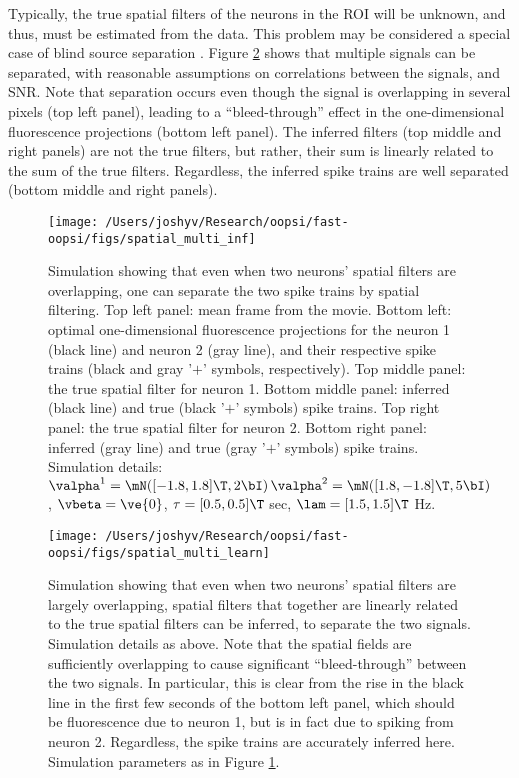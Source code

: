 Typically, the true spatial filters of the neurons in the ROI will be unknown, and thus, must be estimated from the data.  This problem may be considered a special case of blind source separation \cite{BellSejnowski95, MukamelSchnitzer09}. Figure \ref{fig:spatial_multi_learn} shows that multiple signals can be separated, with reasonable assumptions on correlations between the signals, and SNR.  Note that separation occurs even though the signal is overlapping in several pixels (top left panel), leading to a ``bleed-through'' effect in the one-dimensional fluorescence projections (bottom left panel). The inferred filters (top middle and right panels) are not the true filters, but rather, their sum is linearly related to the sum of the true filters.  Regardless, the inferred spike trains are well separated (bottom middle and right panels).




\begin{figure}[h!]
\centering \texttt{[image: /Users/joshyv/Research/oopsi/fast-oopsi/figs/spatial\_multi\_inf]}
\caption[overlapping spatial filters are not problematic]{Simulation showing that even when two neurons' spatial filters are overlapping, one can separate the two spike trains by spatial filtering. Top left panel: mean frame from the movie.  Bottom left: optimal one-dimensional fluorescence projections for the neuron 1 (black line) and neuron 2 (gray line), and their respective spike trains (black and gray '$+$' symbols, respectively).  Top middle panel: the true spatial filter for neuron 1.  Bottom middle panel: inferred (black line) and true (black '$+$' symbols) spike trains.  Top right panel: the true spatial filter for neuron 2.   Bottom right panel: inferred (gray line) and true (gray '$+$' symbols) spike trains. Simulation details: $\valpha^1=\mN([-1.8, 1.8]\T,2 \bI)\, \valpha^2=\mN([1.8, -1.8]\T,5 \bI)$, $\vbeta=\ve{0}$, $\tau=[0.5, 0.5]\T$ sec, $\lam=[1.5, 1.5]\T$ Hz.} \label{fig:spatial_multi_inf}
\end{figure}



\begin{figure}[h!]
\centering \texttt{[image: /Users/joshyv/Research/oopsi/fast-oopsi/figs/spatial\_multi\_learn]}
\caption[overlapping spatial filters can be estimated]{Simulation showing that even when two neurons' spatial filters are largely overlapping, spatial filters that together are linearly related to the true spatial filters can be inferred, to separate the two signals. Simulation details as above. Note that the spatial fields are sufficiently overlapping to cause significant ``bleed-through'' between the two signals.  In particular, this is clear from the rise in the black line in the first few seconds of the bottom left panel, which should be fluorescence due to neuron 1, but is in fact due to spiking from neuron 2. Regardless, the spike trains are accurately inferred here.  Simulation parameters as in Figure \ref{fig:spatial_multi_inf}.} \label{fig:spatial_multi_learn}
\end{figure}






